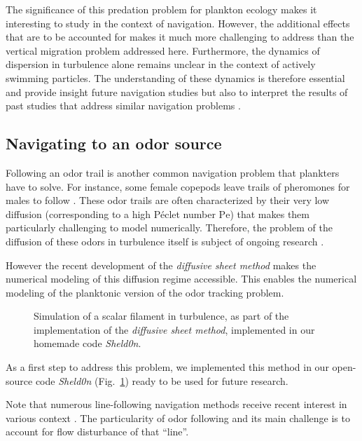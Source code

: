 The significance of this predation problem for plankton ecology makes it interesting to study in the context of navigation.
However, the additional effects that are to be accounted for makes it much more challenging to address than the vertical migration problem addressed here.
Furthermore, the dynamics of dispersion in turbulence alone remains unclear in the context of actively swimming particles.
The understanding of these dynamics is therefore essential and provide insight future navigation studies but also to interpret the results of past studies that address similar navigation problems \citep{alageshan2020machine}.

\subsection{Navigating to an odor source}\label{sec:navigating_odor_source}

Following an odor trail is another common navigation problem that plankters have to solve.
For instance, some female copepods leave trails of pheromones for males to follow \citep{weissburg1998following, bagoien2005blind, yen2010chemical}.
These odor trails are often characterized by their very low diffusion (corresponding to a high Péclet number $\mathrm{Pe}$) that makes them particularly challenging to model numerically.
Therefore, the problem of the diffusion of these odors in turbulence itself is subject of ongoing research \citep{roberts2002turbulent}.

However the recent development of the \textit{diffusive sheet method} \citep{martinez2018diffusive} makes the numerical modeling of this diffusion regime accessible.
This enables the numerical modeling of the planktonic version of the odor tracking problem.
\begin{figure}
    \centering
    \def\svgwidth{0.9\textwidth}
    
    \caption{
    	Simulation of a scalar filament in turbulence, as part of the implementation of the \textit{diffusive sheet method}, implemented in our homemade code \textit{Sheld0n}.
    }
    \label{fig:filament}
\end{figure}
As a first step to address this problem, we implemented this method in our open-source code \textit{Sheld0n} (Fig.~\ref{fig:filament}) ready to be used for future research.

Note that numerous line-following navigation methods receive recent interest in various context \citep{yao2020path}.
The particularity of odor following and its main challenge is to account for flow disturbance of that ``line''.

